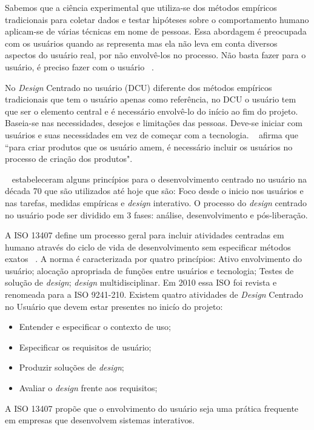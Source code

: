 Sabemos que a ciência experimental que utiliza-se dos métodos empíricos tradicionais para coletar dados e testar hipóteses sobre o comportamento humano aplicam-se de várias técnicas em nome de pessoas. Essa abordagem é preocupada com os usuários quando as representa mas ela não leva em conta diversos aspectos do usuário real, por não envolvê-los no processo. Não basta fazer para o usuário, é preciso fazer com o usuário ~\cite{eason1995}. 

No \emph{Design} Centrado no usuário (DCU) diferente dos métodos empíricos tradicionais que tem o usuário apenas como  referência, no DCU o usuário tem que ser o elemento central e é necessário envolvê-lo do início ao fim do projeto. Baseia-se nas necessidades, desejos e limitações das pessoas. Deve-se iniciar com usuários e suas necessidades em vez de começar com a tecnologia. ~ afirma que ``para criar produtos que os usuário amem, é necessário incluir os usuários no processo de criação dos produtos". 

~ estabeleceram alguns princípios para o desenvolvimento centrado no usuário na década 70 que são utilizados até hoje que são: Foco desde o inicio nos usuários e nas tarefas, medidas empíricas e \emph{design} interativo. O processo do \emph{design} centrado no usuário pode ser dividido em 3 fases: análise, desenvolvimento e pós-liberação. 
	
A ISO 13407 define um processo geral para incluir atividades centradas em humano através do ciclo de vida de desenvolvimento sem especificar métodos exatos ~\cite{santos2012}.
%
A norma é caracterizada por quatro princípios: Ativo envolvimento do usuário; alocação apropriada de funções entre usuários e tecnologia; Testes de solução de \emph{design}; \emph{design} multidisciplinar. Em 2010 essa ISO foi revista e renomeada para a ISO 9241-210.
%
Existem quatro atividades de \emph{Design} Centrado no Usuário que devem estar presentes no inicío do projeto:

\begin{itemize}
\item Entender e especificar o contexto de uso;
\item Especificar os requisitos de usuário;
\item Produzir soluções de \emph{design};
\item Avaliar o \emph{design} frente aos requisitos;
\end{itemize}

A ISO 13407 propõe que o envolvimento do usuário seja uma prática frequente em empresas que desenvolvem sistemas interativos.

